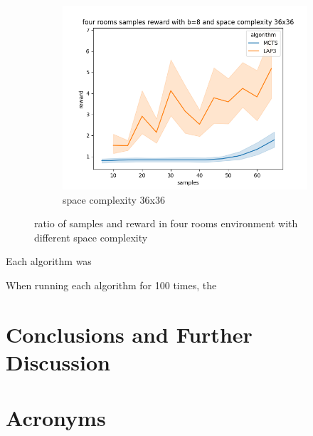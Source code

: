\documentclass[bibliography=totoc]{scrartcl}
\begin{document}
\begin{figure}[h!]
\begin{subfigure}[b]{0.3\linewidth}
		\includegraphics[width=\linewidth]{img/four_rooms_samples__reward_b_8_LAP3_MCTS_36.png}
        \caption{space complexity 36x36}
	\end{subfigure}
	\caption{ratio of samples and reward in four rooms environment with different space complexity}
	\label{fig:known_problems}
\end{figure}


Each algorithm was 

When running each algorithm for 100 times, the 


\section{Conclusions and Further Discussion}


\clearpage


\section*{Acronyms} 

\begin{acronym}[....]
\end{acronym}



\end{document}
